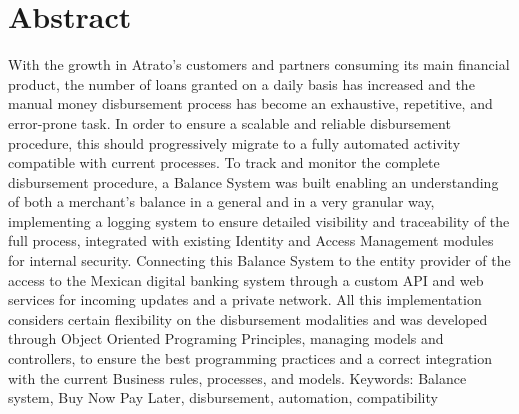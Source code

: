 
\chapter*{Abstract}

With the growth in Atrato’s customers and partners consuming its main financial product, the number of loans granted on a daily basis has increased and the manual money disbursement process has become an exhaustive, repetitive, and error-prone task. In order to ensure a scalable and reliable disbursement procedure, this should progressively migrate to a fully automated activity compatible with current processes. To track and monitor the complete disbursement procedure, a Balance System was built enabling an understanding of both a merchant's balance in a general and in a very granular way, implementing a logging system to ensure detailed visibility and traceability of the full process, integrated with existing Identity and Access Management modules for internal security. Connecting this Balance System to the entity provider of the access to the Mexican digital banking system through a custom API and web services for incoming updates and a private network. All this implementation considers certain flexibility on the disbursement modalities and was developed through Object Oriented Programing Principles, managing models and controllers, to ensure the best programming practices and a correct integration with the current Business rules, processes, and models.
Keywords: Balance system, Buy Now Pay Later, disbursement, automation, compatibility
